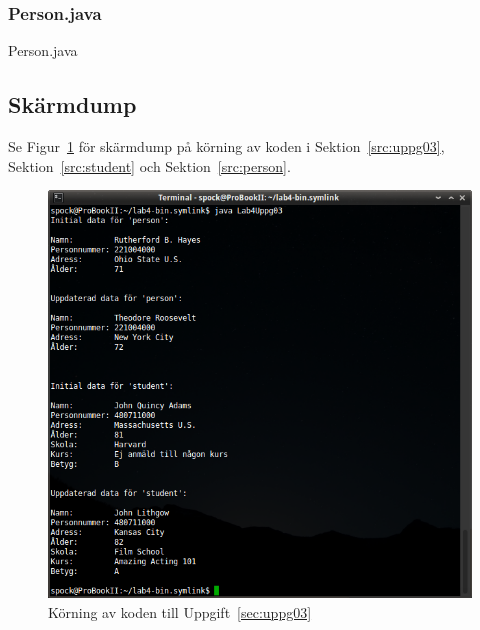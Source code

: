 \subsubsection{Person.java}
\caption{Person.java}
\label{src:person}

\subsection{Skärmdump}
Se Figur~\ref{fig:uppg03-screenshot} för skärmdump på körning av koden i
Sektion~\ref{src:uppg03}, Sektion~\ref{src:student} och
Sektion~\ref{src:person}.

\begin{figure}[htbp]
\centering
\includegraphics[width=\linewidth]{img/03.png}
\caption{Körning av koden till Uppgift~\ref{sec:uppg03}}
\label{fig:uppg03-screenshot}
\end{figure}

